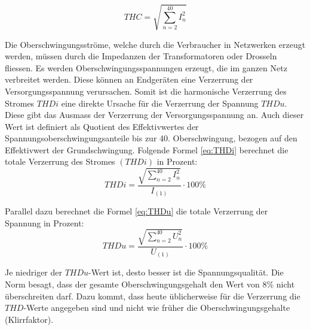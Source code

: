 \begin{equation}\label{eq:THC}
THC = {\sqrt{\sum_{n=2}^{40} I_n^2}}
\end{equation}


Die Oberschwingungsströme, welche durch die Verbraucher in Netzwerken erzeugt werden, müssen durch die Impedanzen der Transformatoren oder Drosseln fliessen.  Es werden Oberschwingungsspannungen erzeugt, die im ganzen Netz verbreitet werden. Diese können an Endgeräten eine Verzerrung der Versorgungsspannung verursachen. Somit ist die harmonische Verzerrung des Stromes $THDi$ eine direkte Ursache für die Verzerrung der Spannung $THDu$. Diese gibt das Ausmass der Verzerrung der Versorgungsspannung an. Auch dieser Wert ist definiert als Quotient des Effektivwertes der Spannungsoberschwingungsanteile bis zur 40. Oberschwingung, bezogen auf den Effektivwert der Grundschwingung. 
Folgende Formel \ref{eq:THDi} berechnet die totale Verzerrung des Stromes $(THDi)$ in Prozent:
\begin{equation}\label{eq:THDi}
THDi = \frac{\sqrt{\sum_{n=2}^{40} I_n^2}}{I_{(1)}} \cdot 100 \%
\end{equation}

Parallel dazu berechnet die Formel \ref{eq:THDu} die totale Verzerrung der Spannung in Prozent:
\begin{equation}\label{eq:THDu}
THDu = \frac{\sqrt{\sum_{n=2}^{40} U_n^2}}{U_{(1)}} \cdot 100\%
\end{equation}


Je niedriger der $THDu$-Wert ist, desto besser ist die Spannungsqualität. Die Norm besagt, dass der gesamte Oberschwingungsgehalt den Wert von 8\% nicht überschreiten darf. Dazu kommt, dass heute üblicherweise für die Verzerrung die $THD$-Werte angegeben sind und nicht wie früher die Oberschwingungsgehalte (Klirrfaktor).\\
\newpage
